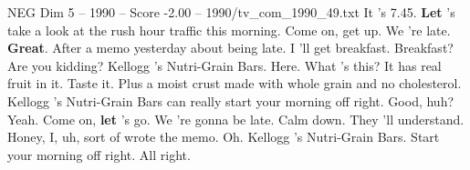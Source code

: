 \begin{textsample}{NEG Dim 5 – 1990 – Score -2.00 – 1990/tv\_com\_1990\_49.txt}  \label{ex:f5_neg_075}
It 's 7.45. \textbf{Let} 's take a look at the rush hour traffic this morning.
Come on, get up.
We 're late. \textbf{Great}.
After a memo yesterday about being late.
I 'll get breakfast.
Breakfast?
Are you kidding?
Kellogg 's Nutri-Grain Bars.
Here.
What 's this?
It has real fruit in it.
Taste it.
Plus a moist crust made with whole grain and no cholesterol.
Kellogg 's Nutri-Grain Bars can really start your morning off right.
Good, huh?
Yeah.
Come on, \textbf{let} 's go.
We 're gonna be late.
Calm down.
They 'll understand.
Honey, I, uh, sort of wrote the memo.
Oh.
Kellogg 's Nutri-Grain Bars.
Start your morning off right.
All right.

\end{textsample}
